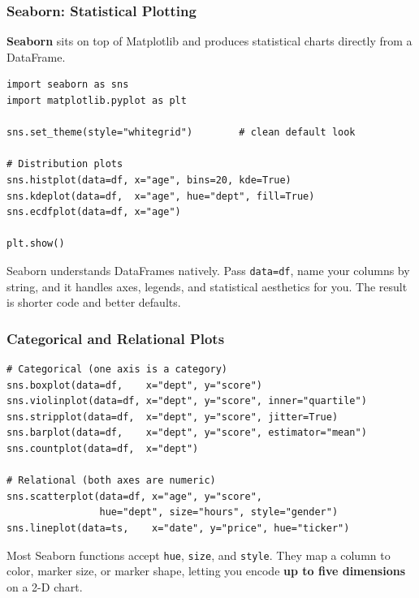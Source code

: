 \documentclass[aspectratio=169,10pt]{beamer}
\newcommand{\keyword}[1]{\textcolor{PrimaryBlue}{\textbf{#1}}}
\newcommand{\codeword}[1]{\texttt{#1}}
\newenvironment{bluebox}[1]{%
  \vspace{0.08cm}\begin{tcolorbox}[lecturebox,title={#1},fontupper=\small]%
}{\end{tcolorbox}\vspace{0.05cm}}
\begin{document}
\begin{frame}[fragile]
\frametitle{Seaborn: Statistical Plotting}
\small
\keyword{Seaborn} sits on top of Matplotlib and produces statistical charts directly from a DataFrame.

\vspace{0.12cm}
\begin{lstlisting}[style=pycode]
import seaborn as sns
import matplotlib.pyplot as plt

sns.set_theme(style="whitegrid")        # clean default look

# Distribution plots
sns.histplot(data=df, x="age", bins=20, kde=True)
sns.kdeplot(data=df,  x="age", hue="dept", fill=True)
sns.ecdfplot(data=df, x="age")

plt.show()
\end{lstlisting}

\begin{bluebox}{Why prefer Seaborn?}
Seaborn understands DataFrames natively. Pass \codeword{data=df}, name your columns by string, and it handles axes, legends, and statistical aesthetics for you. The result is shorter code and better defaults.
\end{bluebox}
\end{frame}


\begin{frame}[fragile]
\frametitle{Categorical and Relational Plots}
\small
\begin{lstlisting}[style=pycode]
# Categorical (one axis is a category)
sns.boxplot(data=df,    x="dept", y="score")
sns.violinplot(data=df, x="dept", y="score", inner="quartile")
sns.stripplot(data=df,  x="dept", y="score", jitter=True)
sns.barplot(data=df,    x="dept", y="score", estimator="mean")
sns.countplot(data=df,  x="dept")

# Relational (both axes are numeric)
sns.scatterplot(data=df, x="age", y="score",
                hue="dept", size="hours", style="gender")
sns.lineplot(data=ts,    x="date", y="price", hue="ticker")
\end{lstlisting}

\begin{tcolorbox}[lecturebox,title=The hue / size / style trio]
Most Seaborn functions accept \codeword{hue}, \codeword{size}, and \codeword{style}. They map a column to color, marker size, or marker shape, letting you encode \keyword{up to five dimensions} on a 2-D chart.
\end{tcolorbox}
\end{frame}
\end{document}
